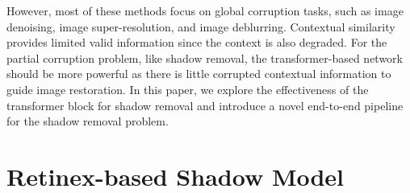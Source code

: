 \documentclass[letterpaper]{article} \usepackage{aaai23}  \usepackage{times}  \usepackage{helvet}  \usepackage{courier}  \usepackage[hyphens]{url}  \usepackage{graphicx} \urlstyle{rm} \def\UrlFont{\rm}  \usepackage{natbib}  \usepackage{caption} \frenchspacing  \setlength{\pdfpagewidth}{8.5in} \setlength{\pdfpageheight}{11in} \usepackage{algorithm}
\begin{document}
However, most of these methods focus on global corruption tasks, such as image denoising, image super-resolution, and image deblurring.
Contextual similarity provides limited valid information since the context is also degraded.
For the partial corruption problem, like shadow removal, the transformer-based network should be more powerful as there is little corrupted contextual information to guide image restoration.
In this paper, we explore the effectiveness of the transformer block for shadow removal and introduce a novel end-to-end pipeline for the shadow removal problem.





\section{Retinex-based Shadow Model}
\end{document}
